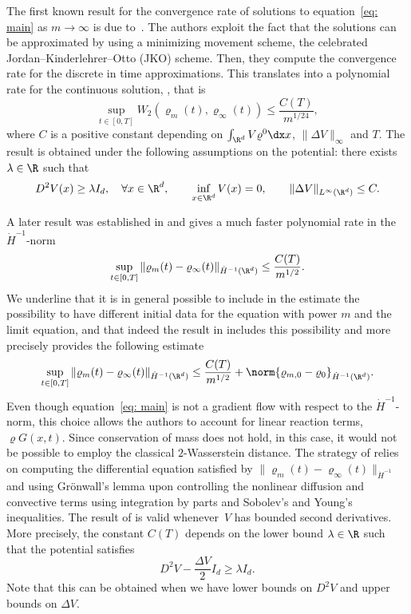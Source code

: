 The first known result for the convergence rate of solutions to equation~\eqref{eq: main} as $m\to\infty$ is due to~\cite{AKY14}. The authors exploit the fact that the solutions can be approximated by using a minimizing movement scheme, the celebrated Jordan--Kinderlehrer--Otto (JKO) scheme. Then, they compute the convergence rate for the discrete in time approximations. This translates into a polynomial rate for the continuous solution, \cite[Th.\,4.2.]{AKY14}, that is
\begin{equation*}
\sup_{t\in[0,T]} W_2(\varrho_m(t),\varrho_\infty(t))\leq \frac{C(T)}{m^{1/24}},
\end{equation*}
where $C$ is a positive constant depending on $\int_{\R^d} V \varrho^0 \dx x$, $\|\Delta V\|_\infty$ and $T$.
The result is obtained under the following assumptions on the potential: there exists $\lambda\in\R$ such that
\begin{equation*}
D^2 V(x) \geq \lambda I_d, \quad \forall x \in \R^d, \qquad \inf_{x\in\R^d} V(x) = 0, \qquad
\|\Delta V\|_{L^{\infty}(\R^d)}\leq C.
\end{equation*}

A later result was established in \cite[Th.\,1.1]{DDP2021} and gives a much faster polynomial rate in the $\dot{H}^{-1}$-norm
\begin{equation*}
\sup_{t\in[0,T]} \|\varrho_m(t) - \varrho_\infty(t)\|_{\dot{H}^{-1}(\R^d)} \leq\frac{C(T)}{{m}^{1/2}}.
\end{equation*}
We underline that it is in general possible to include in the estimate the possibility to have different initial data for the equation with power $m$ and the limit equation, and that indeed the result in \cite{DDP2021} includes this possibility and more precisely provides the following estimate
\begin{equation*}
\sup_{t\in[0,T]} \|\varrho_m(t) - \varrho_\infty(t)\|_{\dot{H}^{-1}(\R^d)} \leq\frac{C(T)}{{m}^{1/2}} + \norm{\varrho_{m,0}-\varrho_{0}}_{\dot{H}^{-1}(\R^d)}.
\end{equation*}
Even though equation~\eqref{eq: main} is not a gradient flow with respect to the $\dot{H}^{-1}$-norm, this choice allows the authors to account for linear reaction terms, $\varrho G(x,t)$. Since conservation of mass does not hold, in this case, it would not be possible to employ the classical $2$-Wasserstein distance. The strategy of \cite{DDP2021} relies on computing the differential equation satisfied by $\|\varrho_m(t)-\varrho_\infty(t)\|_{\dot{H}^{-1}}$ and using Grönwall's lemma upon controlling the nonlinear diffusion and convective terms using integration by parts and Sobolev's and Young's inequalities. The result of \cite{DDP2021} is valid whenever~$V$ has bounded second derivatives. More precisely, the constant $C(T)$ depends on the lower bound $\lambda\in\R$ such that the potential satisfies
\begin{equation}\label{assum: H-1}
D^2V - \frac{\Delta V}{2}I_d \geq \lambda I_d.
\end{equation}
Note that this can be obtained when we have lower bounds on $D^2V$ and upper bounds on $\Delta V$.

